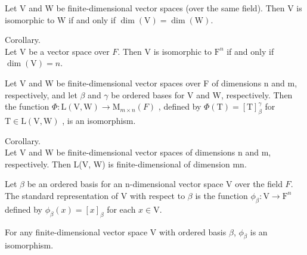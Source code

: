 \begin{thm*}[2.19]$ $\\
Let V and W be finite-dimensional vector spaces (over the same field). Then V is isomorphic to W if and only if $\dim(\mathrm{V}) = \dim(\mathrm{W})$.

\end{thm*}

Corollary.$ $\\
Let V be a vector space over $F$. Then V is isomorphic to $\mathrm{F}^n$
if and only if $\dim(\mathrm{V}) = n$.

\begin{thm*}[2.20]$ $\\
Let V and W be finite-dimensional vector spaces over F of dimensions n and m, respectively, and let $\beta$ and $\gamma$ be ordered bases for V and W, respectively. Then the function $\Phi:\mathrm{L}(\mathrm{V},\mathrm{W}) \rightarrow \mathrm{M}_{m \times n}(F)$ , defined by $\Phi(\mathrm{T}) = [\mathrm{T}]^\gamma_\beta$ for $\mathrm{T} \in \mathrm{L}(\mathrm{V},\mathrm{W})$ , is an isomorphism.
\end{thm*}

Corollary.$ $\\
Let V and W be finite-dimensional vector spaces of dimensions n and m, respectively. Then L(V, W) is finite-dimensional of dimension mn.

\begin{defn}$ $\\
Let $\beta$ be an ordered basis for an n-dimensional vector space V over the field $F$. The standard representation of V with respect to $\beta$ is the function $\phi_\beta:\mathrm{V} \rightarrow \mathrm{F}^n$ defined by $\phi_\beta(x)=[x]_\beta$ for each $x \in \mathrm{V}$.	
\end{defn}

\begin{thm*}[2.21]$ $\\
	For any finite-dimensional vector space V with ordered basis $\beta$, $\phi_\beta$ is an isomorphism.
\end{thm*}
















		

